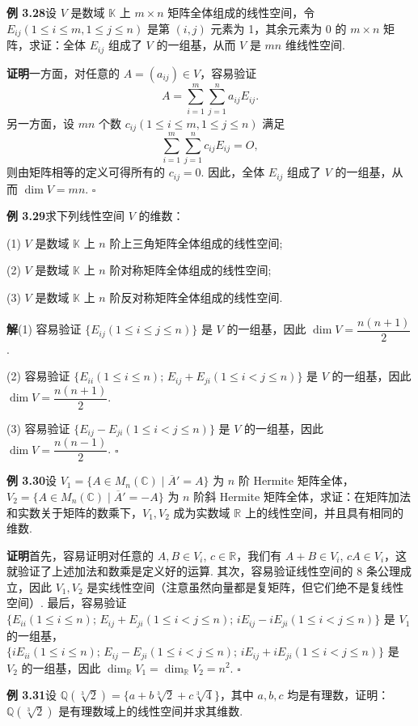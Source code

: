 \documentclass[UTF8,12pt,a4paper,fontset=fandol]{ctexart}
\begin{document}
\noindent\textbf{例 3.28}\quad 设 $V$ 是数域 $\mathbb{K}$ 上 $m\times n$ 矩阵全体组成的线性空间，令 $E_{ij}(1\le i\le m,1\le j\le n)$ 是第 $(i,j)$ 元素为 1，其余元素为 0 的 $m\times n$ 矩阵，求证：全体 $E_{ij}$ 组成了 $V$ 的一组基，从而 $V$ 是 $mn$ 维线性空间.

\noindent\textbf{证明}\quad 一方面，对任意的 $A=(a_{ij})\in V$，容易验证
\[
A=\sum_{i=1}^m\sum_{j=1}^n a_{ij}E_{ij}.
\]
另一方面，设 $mn$ 个数 $c_{ij}(1\le i\le m,1\le j\le n)$ 满足
\[
\sum_{i=1}^m\sum_{j=1}^n c_{ij}E_{ij}=O,
\]
则由矩阵相等的定义可得所有的 $c_{ij}=0$. 因此，全体 $E_{ij}$ 组成了 $V$ 的一组基，从而 $\dim V=mn$. $\square$

\noindent\textbf{例 3.29}\quad 求下列线性空间 $V$ 的维数：

(1) $V$ 是数域 $\mathbb{K}$ 上 $n$ 阶上三角矩阵全体组成的线性空间;

(2) $V$ 是数域 $\mathbb{K}$ 上 $n$ 阶对称矩阵全体组成的线性空间;

(3) $V$ 是数域 $\mathbb{K}$ 上 $n$ 阶反对称矩阵全体组成的线性空间.

\noindent\textbf{解}\quad (1) 容易验证 $\{E_{ij}(1\le i\le j\le n)\}$ 是 $V$ 的一组基，因此 $\dim V=\dfrac{n(n+1)}{2}$.

(2) 容易验证 $\{E_{ii}(1\le i\le n);\,E_{ij}+E_{ji}(1\le i<j\le n)\}$ 是 $V$ 的一组基，因此 $\dim V=\dfrac{n(n+1)}{2}$.

(3) 容易验证 $\{E_{ij}-E_{ji}(1\le i<j\le n)\}$ 是 $V$ 的一组基，因此 $\dim V=\dfrac{n(n-1)}{2}$. $\square$

\noindent\textbf{例 3.30}\quad 设 $V_1=\{A\in M_n(\mathbb{C})\mid \overline{A}'=A\}$ 为 $n$ 阶 Hermite 矩阵全体，$V_2=\{A\in M_n(\mathbb{C})\mid \overline{A}'=-A\}$ 为 $n$ 阶斜 Hermite 矩阵全体，求证：在矩阵加法和实数关于矩阵的数乘下，$V_1,V_2$ 成为实数域 $\mathbb{R}$ 上的线性空间，并且具有相同的维数.

\noindent\textbf{证明}\quad 首先，容易证明对任意的 $A,B\in V_i$, $c\in\mathbb{R}$，我们有 $A+B\in V_i$, $cA\in V_i$，这就验证了上述加法和数乘是定义好的运算. 其次，容易验证线性空间的 8 条公理成立，因此 $V_1,V_2$ 是实线性空间（注意虽然向量都是复矩阵，但它们绝不是复线性空间）. 最后，容易验证 $\{E_{ii}(1\le i\le n);\,E_{ij}+E_{ji}(1\le i<j\le n);\,iE_{ij}-iE_{ji}(1\le i<j\le n)\}$ 是 $V_1$ 的一组基，$\{iE_{ii}(1\le i\le n);\,E_{ij}-E_{ji}(1\le i<j\le n);\,iE_{ij}+iE_{ji}(1\le i<j\le n)\}$ 是 $V_2$ 的一组基，因此 $\dim_{\mathbb{R}}V_1=\dim_{\mathbb{R}}V_2=n^2$. $\square$

\noindent\textbf{例 3.31}\quad 设 $\mathbb{Q}(\sqrt[3]{2})=\{a+b\sqrt[3]{2}+c\sqrt[3]{4}\}$，其中 $a,b,c$ 均是有理数，证明：$\mathbb{Q}(\sqrt[3]{2})$ 是有理数域上的线性空间并求其维数.
\end{document}
